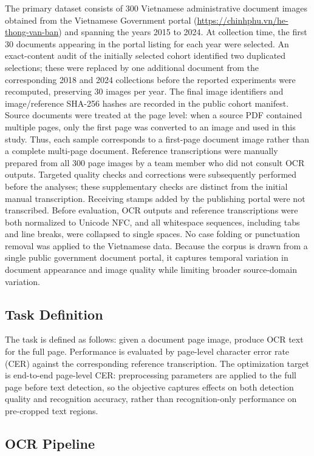 \documentclass[pdflatex,sn-basic,Numbered,iicol]{sn-jnl}
\begin{document}
The primary dataset consists of 300 Vietnamese administrative document images obtained from the Vietnamese Government portal (\url{https://chinhphu.vn/he-thong-van-ban}) and spanning the years 2015 to 2024. At collection time, the first 30 documents appearing in the portal listing for each year were selected. An exact-content audit of the initially selected cohort identified two duplicated selections; these were replaced by one additional document from the corresponding 2018 and 2024 collections before the reported experiments were recomputed, preserving 30 images per year. The final image identifiers and image/reference SHA-256 hashes are recorded in the public cohort manifest. Source documents were treated at the page level: when a source PDF contained multiple pages, only the first page was converted to an image and used in this study. Thus, each sample corresponds to a first-page document image rather than a complete multi-page document. Reference transcriptions were manually prepared from all 300 page images by a team member who did not consult OCR outputs. Targeted quality checks and corrections were subsequently performed before the analyses; these supplementary checks are distinct from the initial manual transcription. Receiving stamps added by the publishing portal were not transcribed. Before evaluation, OCR outputs and reference transcriptions were both normalized to Unicode NFC, and all whitespace sequences, including tabs and line breaks, were collapsed to single spaces. No case folding or punctuation removal was applied to the Vietnamese data. Because the corpus is drawn from a single public government document portal, it captures temporal variation in document appearance and image quality while limiting broader source-domain variation.

\subsection{Task Definition}

The task is defined as follows: given a document page image, produce OCR text for the full page. Performance is evaluated by page-level character error rate (CER) against the corresponding reference transcription. The optimization target is end-to-end page-level CER: preprocessing parameters are applied to the full page before text detection, so the objective captures effects on both detection quality and recognition accuracy, rather than recognition-only performance on pre-cropped text regions.

\subsection{OCR Pipeline}
\end{document}
